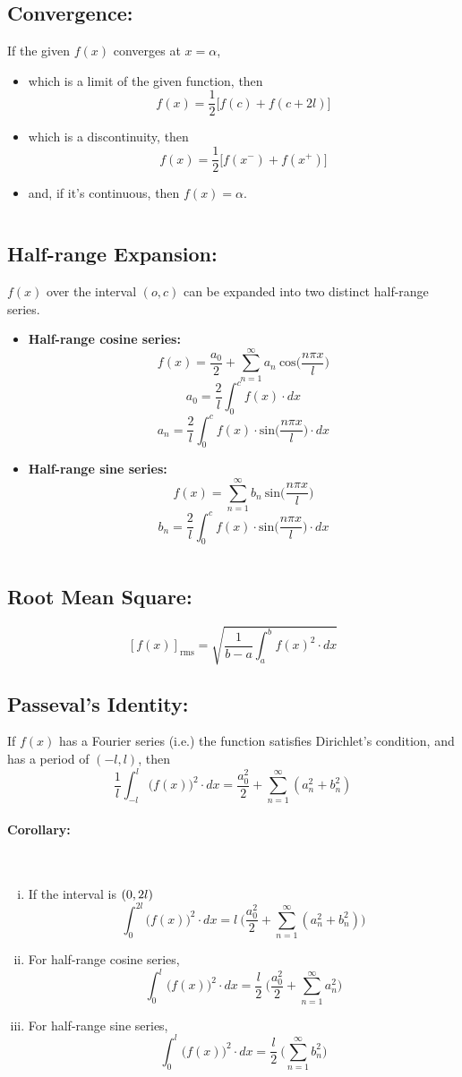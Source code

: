 \documentclass{article}
\newcommand{\para}[1]{\paragraph{#1}\mbox{}\\}
\begin{document}
{\subsection{\LARGE Convergence:}
If the given {\LARGE $f(x)$} converges at {\LARGE $x=\alpha$},
\begin{itemize}
\item which is a limit of the given function, then {\LARGE $$f(x)=\frac{1}2\big[f(c)+f(c+2l)\big]$$}
\item which is a discontinuity, then
{\LARGE $$f(x)=\frac{1}2\big[f(x^-)+f(x^+)\big]$$}
\item and, if it's continuous, then {\LARGE $f(x)=\alpha$}.
\end{itemize}
$\ $
\subsection{\LARGE Half-range Expansion:}
{\LARGE $f(x)$} over the interval {\LARGE $(o,c)$} can be expanded into two distinct half-range series.
\begin{itemize}
\item \textbf{Half-range cosine series:}
{\LARGE $$f(x)=\frac{a_0}2+\sum_{n=1}^\infty a_n\ \mathrm{cos}\bigg(\frac{n\pi x}{l}\bigg)$$
$$a_0=\frac{2}l\int_0^c f(x)\cdot dx$$}
{\LARGE $$a_n=\frac{2}l\int_0^c f(x)\cdot \mathrm{sin}\bigg(\frac{n\pi x}{l}\bigg)\cdot dx$$}
$\ $
\item \textbf{Half-range sine series:}
{\LARGE $$f(x)=\sum_{n=1}^\infty b_n\ \mathrm{sin}\bigg(\frac{n\pi x}{l}\bigg)$$
$$b_n=\frac{2}l\int_0^c f(x)\cdot \mathrm{sin}\bigg(\frac{n\pi x}{l}\bigg)\cdot dx$$}
\end{itemize}
$\ $
\subsection{\LARGE Root Mean Square:}
{\LARGE $$[f(x)]_{\mathrm{rms}}=\sqrt{\frac{1}{b-a}\int_a^b f(x)^2\cdot dx}$$}
\subsection{\LARGE Passeval's Identity:}
If {\LARGE $f(x)$} has a Fourier series (i.e.) the function satisfies Dirichlet's condition, and has a period of {\LARGE $(-l,l)$}, then
{\LARGE $$\frac{1}l\int_{-l}^{l}\big(f(x)\big)^2\cdot dx=\frac{a_0^2}2+\sum_{n=1}^\infty(a_n^2+b_n^2)$$}
\newpage
\para{\Large Corollary:}
\begin{enumerate}[(i)]
\item If the interval is ${\LARGE (0,2l)}$ {\LARGE $$\int_{0}^{2l}\big(f(x)\big)^2\cdot dx=l\ \bigg(\frac{a_0^2}2+\sum_{n=1}^\infty(a_n^2+b_n^2)\bigg)$$}
\item For half-range cosine series,
{\LARGE $$\int_0^l\big(f(x)\big)^2\cdot dx=\frac{l}2\ \bigg(\frac{a_0^2}2+\sum_{n=1}^\infty a_n^2\bigg)$$}
\item For half-range sine series,
{\LARGE $$\int_0^l\big(f(x)\big)^2\cdot dx=\frac{l}2\ \bigg(\sum_{n=1}^\infty b_n^2\bigg)$$}
\end{enumerate}
$\ $
}
\end{document}
